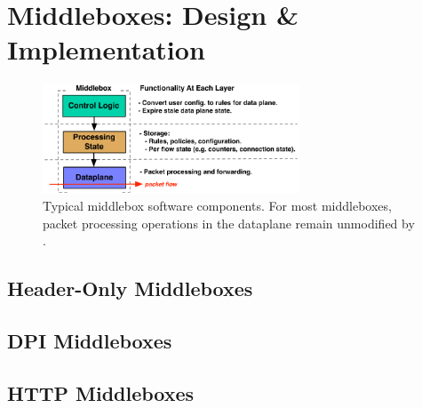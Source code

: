 \section{Middleboxes: Design \& Implementation}
\label{sec:mbs}

\begin{figure}[t]
  \centering
  \includegraphics[width=3in]{fig/mbarch}
  \caption[]{\label{fig:mbarch} Typical middlebox software components. For most middleboxes, packet processing operations in the dataplane remain unmodified by \sys.}
\end{figure}
\subsection{Header-Only Middleboxes}

\subsection{DPI Middleboxes}

\subsection{HTTP Middleboxes}




